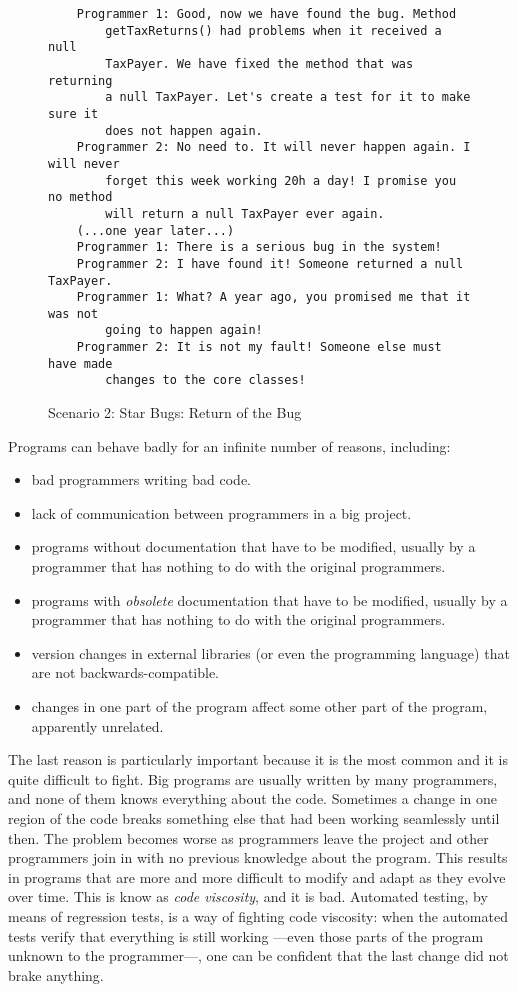 \begin{figure}[tbp]
\begin{verbatim}
    Programmer 1: Good, now we have found the bug. Method 
        getTaxReturns() had problems when it received a null
        TaxPayer. We have fixed the method that was returning 
        a null TaxPayer. Let's create a test for it to make sure it
        does not happen again. 
    Programmer 2: No need to. It will never happen again. I will never
        forget this week working 20h a day! I promise you no method
        will return a null TaxPayer ever again. 
    (...one year later...)
    Programmer 1: There is a serious bug in the system!
    Programmer 2: I have found it! Someone returned a null TaxPayer. 
    Programmer 1: What? A year ago, you promised me that it was not
        going to happen again!
    Programmer 2: It is not my fault! Someone else must have made
        changes to the core classes!
\end{verbatim}  
  \caption{Scenario 2: Star Bugs: Return of the Bug}
  \label{fig:sdfsdsers}
\end{figure}

Programs can behave badly for an infinite number of reasons,
including: 

\begin{itemize}
\item bad programmers writing bad code.
\item lack of communication between programmers in a big project.
\item programs without documentation that have to be modified, usually
  by a programmer that has nothing to do with the original
  programmers.
\item programs with \emph{obsolete} documentation that have to be modified, usually
  by a programmer that has nothing to do with the original
  programmers.
\item version changes in external libraries (or even the programming
  language) that are not backwards-compatible.
\item changes in one part of the program affect some other part of
  the program, apparently unrelated. 
\end{itemize}

The last reason is particularly important because it is the most
common and it is quite difficult to fight. Big programs are usually
written by many programmers, and none of them knows everything about
the code. Sometimes a change in one region of the code breaks something
else that had been working seamlessly until then. The problem becomes worse as
programmers leave the project and other programmers join in with no
previous knowledge about the program. 
This results in programs that
are more and more difficult to modify and adapt as they evolve over
time. This is know as \emph{code viscosity}, and it is bad. Automated
testing, by means of regression tests, is a way of fighting code
viscosity: when the automated tests verify that everything 
is still working ---even those parts of the program unknown to the
programmer---, one can be confident that the last change did
not brake anything. 

